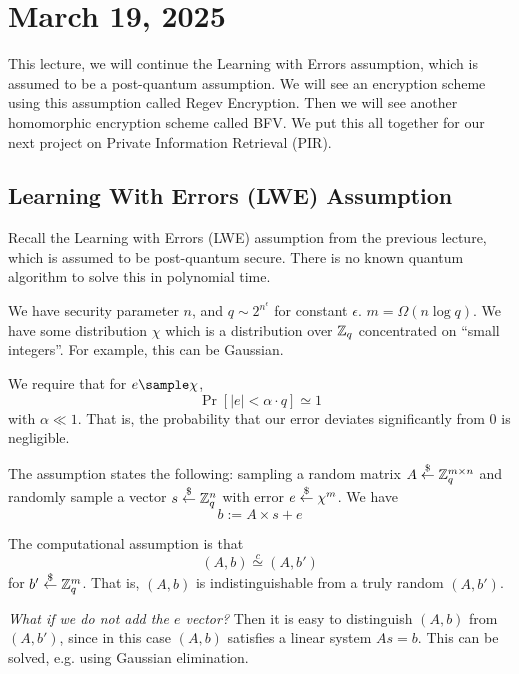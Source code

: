 \section{March 19, 2025}
\label{20250319}

This lecture, we will continue the Learning with Errors assumption, which is assumed to be a post-quantum assumption. We will see an encryption scheme using this assumption called Regev Encryption. Then we will see another homomorphic encryption scheme called BFV. We put this all together for our next project on Private Information Retrieval (PIR).

\subsection{Learning With Errors (LWE) Assumption}
Recall the Learning with Errors (LWE) assumption from the previous lecture, which is assumed to be post-quantum secure. There is no known quantum algorithm to solve this in polynomial time.

We have security parameter $n$, and $q\sim 2^{n^\epsilon}$ for constant $\epsilon$. $m = \Omega (n\log q)$. We have some distribution $\chi$ which is a distribution over $\mathbb Z_q$ concentrated on ``small integers''. For example, this can be Gaussian.

\begin{center}
\def\svgwidth{0.5\columnwidth}

\end{center}

We require that for $e\sample \chi$, 
\[\Pr[|e| < \alpha\cdot q ]\simeq 1\]
with $\alpha \ll 1$. That is, the probability that our error deviates significantly from $0$ is negligible.

The assumption states the following: sampling a random matrix $A\overset{\$}{\leftarrow} \mathbb Z_q^{m\times n}$ and randomly sample a vector $s\overset{\$}{\leftarrow} \mathbb Z_q^n$ with error $e\overset{\$}{\leftarrow} \chi^m$. We have \[b:=A\times s + e\]

The computational assumption is that
\[(A, b)\overset{c}{\simeq} (A, b')\]
for $b'\overset{\$}{\leftarrow} \mathbb Z_q^m$. That is, $(A, b)$ is indistinguishable from a truly random $(A, b')$.

\begin{center}
    \def\svgwidth{0.5\columnwidth}
    
\end{center}

\begin{remark}
    \textit{What if we do not add the $e$ vector?} Then it is easy to distinguish $(A, b)$ from $(A, b')$, since in this case $(A, b)$ satisfies a linear system $As = b$. This can be solved, e.g. using Gaussian elimination.
\end{remark}

